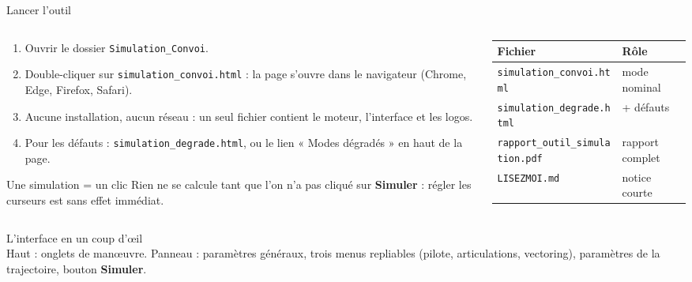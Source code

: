 \documentclass[aspectratio=169,9pt]{beamer}
\begin{document}
\begin{frame}{Lancer l'outil}
  \begin{columns}[T]
  \begin{column}{0.52\textwidth}
    \begin{enumerate}
      \item Ouvrir le dossier \texttt{Simulation\_Convoi}.
      \item Double-cliquer sur \texttt{simulation\_convoi.html} : la page s'ouvre dans le navigateur (Chrome, Edge, Firefox, Safari).
      \item Aucune installation, aucun réseau : un seul fichier contient le moteur, l'interface et les logos.
      \item Pour les défauts : \texttt{simulation\_degrade.html}, ou le lien « Modes dégradés » en haut de la page.
    \end{enumerate}
    \medskip
    \begin{alertblock}{Une simulation = un clic}
      Rien ne se calcule tant que l'on n'a pas cliqué sur \textbf{Simuler} : régler les curseurs est sans effet immédiat.
    \end{alertblock}
  \end{column}
  \begin{column}{0.44\textwidth}
    \begin{tabular}{@{}ll@{}}
      \toprule
      Fichier & Rôle\\\midrule
      \texttt{simulation\_convoi.html} & mode nominal\\
      \texttt{simulation\_degrade.html} & + défauts\\
      \texttt{rapport\_outil\_simulation.pdf} & rapport complet\\
      \texttt{LISEZMOI.md} & notice courte\\\bottomrule
    \end{tabular}
  \end{column}
  \end{columns}
\end{frame}

\begin{frame}{L'interface en un coup d'œil}
  \centering
  \\[1mm]
  {\footnotesize Haut : onglets de manœuvre. Panneau : paramètres généraux, trois menus repliables (pilote, articulations, vectoring), paramètres de la trajectoire, bouton \textbf{Simuler}.}
\end{frame}
\end{document}
